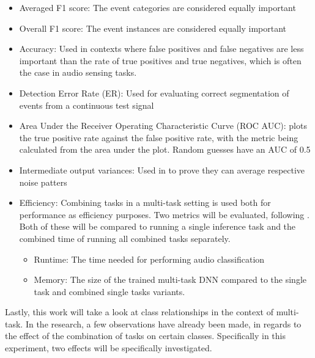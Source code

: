 	\begin{itemize}
		\item Averaged F1 score: The event categories are considered equally important \cite{phan2019unifying}
		\item Overall F1 score: The event instances are considered equally important \cite{phan2019unifying}
		\item Accuracy: Used in contexts where false positives and false negatives are less important than the rate of true positives and true negatives, which is often the case in audio sensing tasks.
		\item Detection Error Rate (ER): Used for evaluating correct segmentation of events from a continuous test signal \cite{phan2019unifying}
		\item Area Under the Receiver Operating Characteristic Curve (ROC AUC): plots the true positive rate against the false positive rate, with the metric being calculated from the area under the plot. Random guesses have an AUC of 0.5 \cite{deshmukh2020multi}
		\item Intermediate output variances: Used in \cite{xia2019multi} to prove they can average respective noise patters
		\item Efficiency: Combining tasks in a multi-task setting is used both for performance as efficiency purposes. Two metrics will be evaluated, following \cite{georgiev2017heterogeneous}. Both of these will be compared to running a single inference task and the combined time of running all combined tasks separately.
		\begin{itemize}
			\item Runtime: The time needed for performing audio classification 
			\item Memory: The size of the trained multi-task DNN compared to the single task and combined single tasks variants.
		\end{itemize}
	\end{itemize}

	Lastly, this work will take a look at class relationships in the context of multi-task. In the research, a few observations have already been made, in regards to the effect of the combination of tasks on certain classes. Specifically in this experiment, two effects will be specifically investigated. 
	
